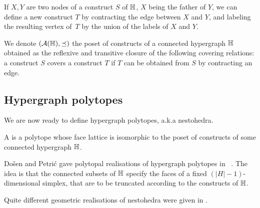 If $X,Y$ are two nodes of a construct $S$ of ${\mathbb H}$, $X$ being the father of $Y$, we can define a new construct $T$ by contracting the edge between $X$ and $Y$, and labeling the resulting vertex of~$T$ by the union of the labels of $X$ and $Y$. 

\begin{definition}
    We denote $({\cal A}({\mathbb H}),\preceq)$ the poset of constructs of a connected hypergraph ${\mathbb H}$ obtained as the reflexive and transitive closure of the following covering relations: a construct $S$ covers a construct $T$ if $T$ can be obtained from $S$ by contracting an edge.
\end{definition}


\subsection{Hypergraph polytopes}

We are now ready to define hypergraph polytopes, a.k.a nestohedra.

\begin{definition}
    A  is a polytope whose face lattice is isomorphic to the poset of constructs of some connected hypergraph ${\mathbb H}$.
\end{definition}

Do\v sen and Petri\'c gave polytopal realisations of hypergraph polytopes in ~\cite{DP-HP}.
The idea is that the connected subsets of ${\mathbb H}$ specify the faces of a fixed $(|H|-1)$-dimensional simplex, that are to be truncated according to the constructs of ${\mathbb H}$.

\begin{rem}
    Quite different geometric realisations of nestohedra were given in \cite{P09}. 
\end{rem}



